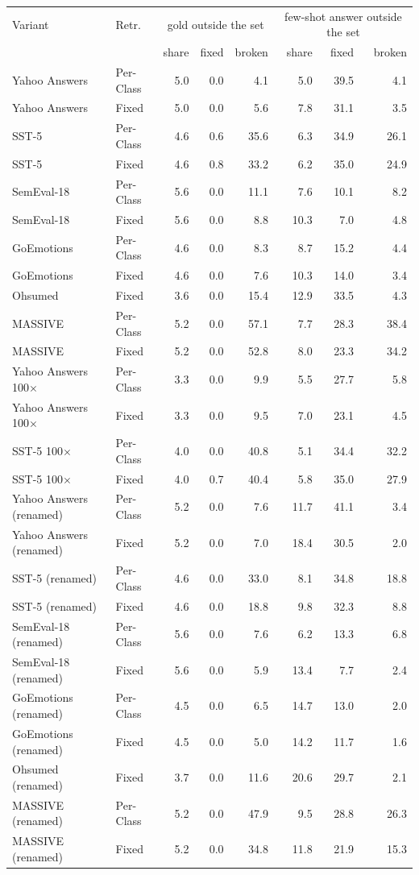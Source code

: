 \begin{tabular}{llrrrrrr}
\toprule
Variant & Retr. & \multicolumn{3}{c}{gold outside the set} & \multicolumn{3}{c}{few-shot answer outside the set} \\
 & & share & fixed & broken & share & fixed & broken \\
\midrule
Yahoo Answers & Per-Class & 5.0 & 0.0 & 4.1 & 5.0 & 39.5 & 4.1 \\
Yahoo Answers & Fixed & 5.0 & 0.0 & 5.6 & 7.8 & 31.1 & 3.5 \\
SST-5 & Per-Class & 4.6 & 0.6 & 35.6 & 6.3 & 34.9 & 26.1 \\
SST-5 & Fixed & 4.6 & 0.8 & 33.2 & 6.2 & 35.0 & 24.9 \\
SemEval-18 & Per-Class & 5.6 & 0.0 & 11.1 & 7.6 & 10.1 & 8.2 \\
SemEval-18 & Fixed & 5.6 & 0.0 & 8.8 & 10.3 & 7.0 & 4.8 \\
GoEmotions & Per-Class & 4.6 & 0.0 & 8.3 & 8.7 & 15.2 & 4.4 \\
GoEmotions & Fixed & 4.6 & 0.0 & 7.6 & 10.3 & 14.0 & 3.4 \\
Ohsumed & Fixed & 3.6 & 0.0 & 15.4 & 12.9 & 33.5 & 4.3 \\
MASSIVE & Per-Class & 5.2 & 0.0 & 57.1 & 7.7 & 28.3 & 38.4 \\
MASSIVE & Fixed & 5.2 & 0.0 & 52.8 & 8.0 & 23.3 & 34.2 \\
Yahoo Answers 100$\times$ & Per-Class & 3.3 & 0.0 & 9.9 & 5.5 & 27.7 & 5.8 \\
Yahoo Answers 100$\times$ & Fixed & 3.3 & 0.0 & 9.5 & 7.0 & 23.1 & 4.5 \\
SST-5 100$\times$ & Per-Class & 4.0 & 0.0 & 40.8 & 5.1 & 34.4 & 32.2 \\
SST-5 100$\times$ & Fixed & 4.0 & 0.7 & 40.4 & 5.8 & 35.0 & 27.9 \\
Yahoo Answers (renamed) & Per-Class & 5.2 & 0.0 & 7.6 & 11.7 & 41.1 & 3.4 \\
Yahoo Answers (renamed) & Fixed & 5.2 & 0.0 & 7.0 & 18.4 & 30.5 & 2.0 \\
SST-5 (renamed) & Per-Class & 4.6 & 0.0 & 33.0 & 8.1 & 34.8 & 18.8 \\
SST-5 (renamed) & Fixed & 4.6 & 0.0 & 18.8 & 9.8 & 32.3 & 8.8 \\
SemEval-18 (renamed) & Per-Class & 5.6 & 0.0 & 7.6 & 6.2 & 13.3 & 6.8 \\
SemEval-18 (renamed) & Fixed & 5.6 & 0.0 & 5.9 & 13.4 & 7.7 & 2.4 \\
GoEmotions (renamed) & Per-Class & 4.5 & 0.0 & 6.5 & 14.7 & 13.0 & 2.0 \\
GoEmotions (renamed) & Fixed & 4.5 & 0.0 & 5.0 & 14.2 & 11.7 & 1.6 \\
Ohsumed (renamed) & Fixed & 3.7 & 0.0 & 11.6 & 20.6 & 29.7 & 2.1 \\
MASSIVE (renamed) & Per-Class & 5.2 & 0.0 & 47.9 & 9.5 & 28.8 & 26.3 \\
MASSIVE (renamed) & Fixed & 5.2 & 0.0 & 34.8 & 11.8 & 21.9 & 15.3 \\
\bottomrule
\end{tabular}
